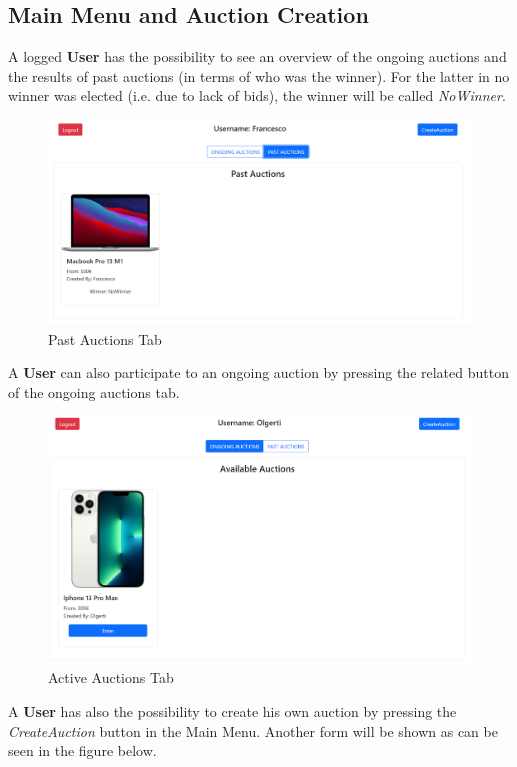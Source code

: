 \subsection{Main Menu and Auction Creation}
A logged \textbf{User} has the possibility to see an overview of the ongoing auctions and the results of past auctions (in terms of who was the winner). For the latter in no winner was elected (i.e. due to lack of bids), the winner will be called \textit{NoWinner}.
\begin{figure}[H]
	\centering
	\includegraphics[width=\linewidth]{img/past_auctions}
	\caption{Past Auctions Tab}
	\label{fig:pastauctions}
\end{figure}

A \textbf{User} can also participate to an ongoing auction by pressing the related button of the ongoing auctions tab. 

\begin{figure}[H]
	\centering
	\includegraphics[width=1\linewidth]{img/active_auctions}
	\caption{Active Auctions Tab}
	\label{fig:activeauctions}
\end{figure}


A \textbf{User} has also the possibility to create his own auction by pressing the \textit{CreateAuction} button in the Main Menu. Another form will be shown as can be seen in the figure below.

